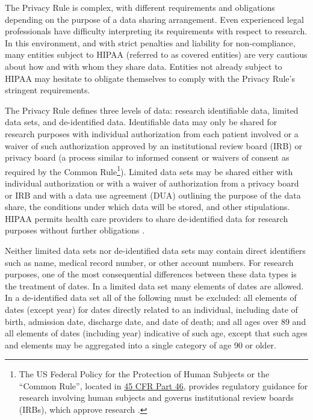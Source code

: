 The Privacy Rule is complex, with different requirements and obligations depending on the purpose of a data sharing arrangement. Even experienced legal professionals have difficulty interpreting its requirements with respect to research. In this environment, and with strict penalties and liability for non-compliance, many entities subject to HIPAA (referred to as covered entities) are very cautious about how and with whom they share data. Entities not already subject to HIPAA may hesitate to obligate themselves to comply with the Privacy Rule's stringent requirements.

The Privacy Rule defines three levels of data: research identifiable data, limited data sets, and de-identified data. Identifiable data may only be shared for research purposes with individual authorization from each patient involved or a waiver of such authorization approved by an institutional review board (IRB) or privacy board (a process similar to informed consent or waivers of consent as required by the Common Rule\footnote{The US Federal Policy for the Protection of Human Subjects or the ``Common Rule'', located in \href{https://www.hhs.gov/ohrp/regulations-and-policy/regulations/45-cfr-46/index.html}{45 CFR Part 46}, provides regulatory guidance for research involving human subjects and governs institutional review boards (IRBs), which approve research \citep{officeforhumanresearchprotections2018a}.}). Limited data sets may be shared either with individual authorization or with a waiver of authorization from a privacy board or IRB and with a data use agreement (DUA) outlining the purpose of the data share, the conditions under which data will be stored, and other stipulations. HIPAA permits health care providers to share de-identified data for research purposes without further obligations \citep{u.s.departmentofhealthhumanservices2018a}.

Neither limited data sets nor de-identified data sets may contain direct identifiers such as name, medical record number, or other account numbers. For research purposes, one of the most consequential differences between these data types is the treatment of dates. In a limited data set many elements of dates are allowed. In a de-identified data set all of the following must be excluded: all elements of dates (except year) for dates directly related to an individual, including date of birth, admission date, discharge date, and date of death; and all ages over 89 and all elements of dates (including year) indicative of such age, except that such ages and elements may be aggregated into a single category of age 90 or older.

